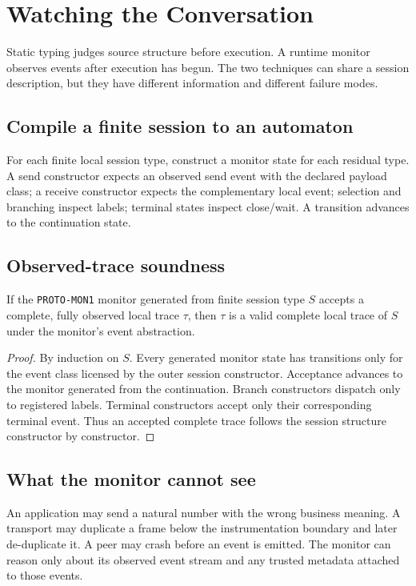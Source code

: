\chapter{Watching the Conversation}

Static typing judges source structure before execution. A runtime monitor observes events after execution has begun. The two techniques can share a session description, but they have different information and different failure modes.

\section{Compile a finite session to an automaton}
For each finite local session type, construct a monitor state for each residual type. A send constructor expects an observed send event with the declared payload class; a receive constructor expects the complementary local event; selection and branching inspect labels; terminal states inspect close/wait. A transition advances to the continuation state.



\section{Observed-trace soundness}
\begin{theorem}
If the \texttt{PROTO-MON1} monitor generated from finite session type $S$ accepts a complete, fully observed local trace $\tau$, then $\tau$ is a valid complete local trace of $S$ under the monitor's event abstraction.
\end{theorem}
\begin{proof}
By induction on $S$. Every generated monitor state has transitions only for the event class licensed by the outer session constructor. Acceptance advances to the monitor generated from the continuation. Branch constructors dispatch only to registered labels. Terminal constructors accept only their corresponding terminal event. Thus an accepted complete trace follows the session structure constructor by constructor.
\end{proof}

\section{What the monitor cannot see}
An application may send a natural number with the wrong business meaning. A transport may duplicate a frame below the instrumentation boundary and later de-duplicate it. A peer may crash before an event is emitted. The monitor can reason only about its observed event stream and any trusted metadata attached to those events.


